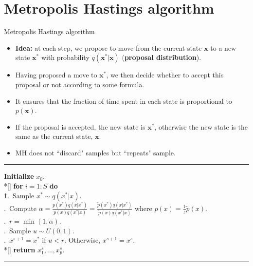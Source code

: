 \documentclass[10pt,mathserif]{beamer}
\begin{document}
\section{Metropolis Hastings algorithm}
\begin{frame}{Metropolis Hastings algorithm}
\begin{itemize}
    \item \textbf{Idea:} at each step, we propose to move from the current state $\bm{x}$ to a new state $\bm{x}^*$ with probability $q(\bm{x}^*|\bm{x})$ (\textbf{proposal distribution}).
    \item Having proposed a move to $\bm{x}^*$, we then decide whether to accept this proposal or not according to some formula.
    \item It ensures that the fraction of time spent in each state is proportional to $p(\bm{x})$.
    \item If the proposal is accepted, the new state is $\bm{x}^*$, otherwise the new state is the same as the current state, $\bm{x}$.
    \item MH does not ``discard" samples but ``repeats" sample.
\end{itemize}

\noindent\rule[-5pt]{\textwidth}{0.4pt}
{\footnotesize
\begin{tabbing}
    {\bf Initialize} $x_0$. \\*[\smallskipamount]
    {\bf for} $i=1:S$ {\bf do}\\
    \qquad \= 1.\ Sample $x^* \sim q(x^*|x)$. \\
    .\ Compute $\alpha = \frac{p(x^*)q(x|x^*)}{p(x)q(x^*|x)} = \frac{\tilde{p}(x^*)q(x|x^*)}{\tilde{p}(x)q(x^*|x)}$ where $p(x)=\frac{1}{z}\tilde{p}(x)$. \\
    .\  $r = \min(1,\alpha)$. \\    
    .\  Sample $u\sim U(0,1)$. \\
    .\ $x^{s+1} = x^*$ if $u<r$. Otherwise, $x^{s+1} = x^s$. \\*[\smallskipamount]
    {\bf return} $x_1^s,\ldots,x_p^s$.
\end{tabbing}}
\noindent\rule[10pt]{\textwidth}{0.4pt}
\end{frame}
\end{document}
